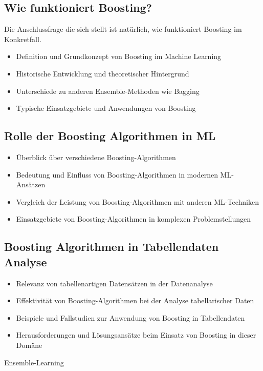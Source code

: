 \subsection{Wie funktioniert Boosting?}
Die Anschlussfrage die sich stellt ist natürlich, wie funktioniert Boosting im Konkretfall.


\begin{itemize}
    \item Definition und Grundkonzept von Boosting im Machine Learning
    \item Historische Entwicklung und theoretischer Hintergrund
    \item Unterschiede zu anderen Ensemble-Methoden wie Bagging
    \item Typische Einsatzgebiete und Anwendungen von Boosting
\end{itemize}

\subsection{Rolle der Boosting Algorithmen in ML}
\begin{itemize}
    \item Überblick über verschiedene Boosting-Algorithmen
    \item Bedeutung und Einfluss von Boosting-Algorithmen in modernen ML-Ansätzen
    \item Vergleich der Leistung von Boosting-Algorithmen mit anderen ML-Techniken
    \item Einsatzgebiete von Boosting-Algorithmen in komplexen Problemstellungen
\end{itemize}

\subsection{Boosting Algorithmen in Tabellendaten Analyse}
\begin{itemize}
    \item Relevanz von tabellenartigen Datensätzen in der Datenanalyse
    \item Effektivität von Boosting-Algorithmen bei der Analyse tabellarischer Daten
    \item Beispiele und Fallstudien zur Anwendung von Boosting in Tabellendaten
    \item Herausforderungen und Lösungsansätze beim Einsatz von Boosting in dieser Domäne
\end{itemize}

Ensemble-Learning\cite{ibmBoosting}